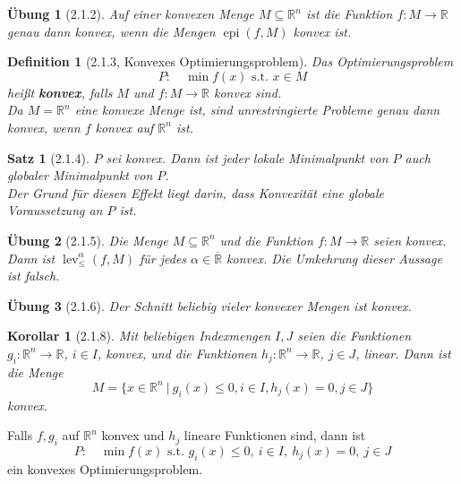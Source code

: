 \documentclass[12pt]{extreport} %
\newcommand{\R}{\mathbb{R}}
\theoremstyle{named}
\theoremstyle{nnamed}
\theoremstyle{itshape}
\newtheorem*{satz}{Satz}
\newtheorem*{definition}{Definition}
\theoremstyle{normal}
\newtheorem*{korollar}{Korollar}
\newtheorem*{uebung}{Übung}
\begin{document}
\begin{uebung}[2.1.2] %
	Auf einer konvexen Menge $M \subseteq \R^n$ ist die Funktion $f \colon M \rightarrow \R$ genau dann konvex, wenn die Mengen $\operatorname{epi}(f, M)$ konvex ist.	
\end{uebung}

\begin{definition}[2.1.3, Konvexes Optimierungsproblem]
	Das Optimierungsproblem
	$$ P: \quad \min f(x) \text{ s.t. } x \in M $$
	heißt \textbf{konvex}, falls $M$ und $f \colon M \rightarrow \R$ konvex sind. ~\\
	
	Da $M = \R^n$ eine konvexe Menge ist, sind unrestringierte Probleme genau dann konvex, wenn $f$ konvex auf $\R^n$ ist.
\end{definition}

\begin{satz}[2.1.4]
	$P$ sei konvex. Dann ist jeder lokale Minimalpunkt von $P$ auch globaler Minimalpunkt von $P$. ~\\
	
	Der Grund für diesen Effekt liegt darin, dass Konvexität eine globale Voraussetzung an $P$ ist.	
\end{satz}

\begin{uebung}[2.1.5] %
	Die Menge $M \subseteq \R^n$ und die Funktion $f \colon M \rightarrow \R$ seien konvex. Dann ist $\operatorname{lev}_{\leq}^{\alpha}(f, M)$ für jedes $\alpha \in \overline{\R}$ konvex. Die Umkehrung dieser Aussage ist falsch.	
\end{uebung}

\begin{uebung}[2.1.6]
	Der Schnitt beliebig vieler konvexer Mengen ist konvex.	
\end{uebung}

\begin{korollar}[2.1.8]
	Mit beliebigen Indexmengen $I, J$ seien die Funktionen $g_i \colon \R^n \rightarrow \R$, $i \in I$, konvex, und die Funktionen $h_j \colon \R^n \rightarrow \R$, $j \in J$, linear. Dann ist die Menge
	$$ M = \big\{ x \in \R^n ~|~g_i(x) \leq 0, i \in I, h_j(x) = 0, j \in J \big\} $$
	konvex.
\end{korollar}

\begin{beispiel}[2.1.9]
	Falls $f, g_i$ auf $\R^n$ konvex und $h_j$ lineare Funktionen sind, dann ist
	$$ P: \quad \min f(x) \text{ s.t. } g_i(x) \leq 0, ~ i \in I,~h_j(x) = 0, ~j \in J $$	
	ein konvexes Optimierungsproblem.
\end{beispiel}
\end{document}
